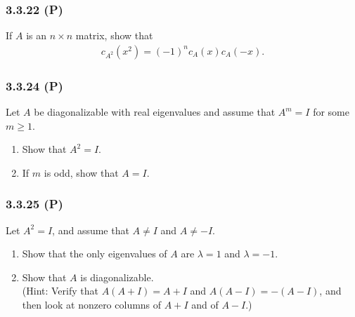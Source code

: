\documentclass[pdf,9pt,t]{beamer}
\begin{document}
\begin{frame}[fragile]
    \frametitle{3.3.22 (P)}
    \begin{problem}
	If $A$ is an $n\times n$ matrix, show that
	\begin{align*}
	    c_{A^2}(x^2) = (-1)^n c_A(x) c_A(-x).
	\end{align*}
    \end{problem}
\end{frame}

\begin{frame}[fragile]
    \frametitle{3.3.24 (P)}
    \begin{problem}
       Let $A$ be diagonalizable with real eigenvalues and assume that $A^m=I$ for some $m\ge 1$.
       \begin{enumerate}
	   \item Show that $A^2=I$.
	   \item If $m$ is odd, show that $A=I$.
       \end{enumerate}
    \end{problem}
\end{frame}

\begin{frame}[fragile]
    \frametitle{3.3.25 (P)}
    \begin{problem}
       Let $A^2=I$, and assume that $A\ne I$ and $A\ne -I$.
       \begin{enumerate}
	   \item Show that the only eigenvalues of $A$ are $\lambda=1$ and $\lambda=-1$.
	   \item Show that $A$ is diagonalizable. \\
	       (Hint: Verify that $A(A+I)=A+I$ and $A(A-I)=-(A-I)$, and then look at nonzero columns of $A+I$ and of $A-I$.)
       \end{enumerate}
    \end{problem}
\end{frame}
\end{document}
